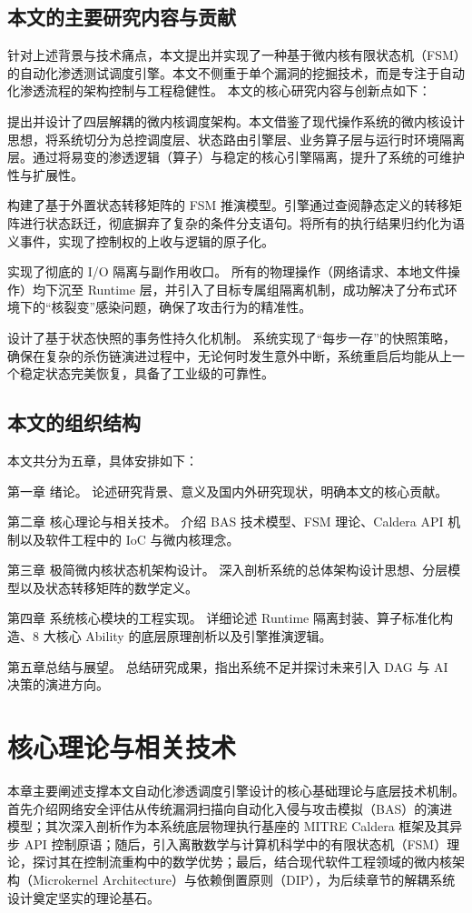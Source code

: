 \documentclass[twoside,openright]{xduugthesis}
\begin{document}
\section{本文的主要研究内容与贡献}
针对上述背景与技术痛点，本文提出并实现了一种基于微内核有限状态机（FSM）的自动化渗透测试调度引擎。本文不侧重于单个漏洞的挖掘技术，而是专注于自动化渗透流程的架构控制与工程稳健性。
本文的核心研究内容与创新点如下：

提出并设计了四层解耦的微内核调度架构。本文借鉴了现代操作系统的微内核设计思想，将系统切分为总控调度层、状态路由引擎层、业务算子层与运行时环境隔离层。通过将易变的渗透逻辑（算子）与稳定的核心引擎隔离，提升了系统的可维护性与扩展性。

构建了基于外置状态转移矩阵的 FSM 推演模型。引擎通过查阅静态定义的转移矩阵进行状态跃迁，彻底摒弃了复杂的条件分支语句。将所有的执行结果归约化为语义事件，实现了控制权的上收与逻辑的原子化。

实现了彻底的 I/O 隔离与副作用收口。 所有的物理操作（网络请求、本地文件操作）均下沉至 Runtime 层，并引入了目标专属组隔离机制，成功解决了分布式环境下的“核裂变”感染问题，确保了攻击行为的精准性。

设计了基于状态快照的事务性持久化机制。 系统实现了“每步一存”的快照策略，确保在复杂的杀伤链演进过程中，无论何时发生意外中断，系统重启后均能从上一个稳定状态完美恢复，具备了工业级的可靠性。

\section{本文的组织结构}
本文共分为五章，具体安排如下：

第一章 绪论。 论述研究背景、意义及国内外研究现状，明确本文的核心贡献。

第二章 核心理论与相关技术。 介绍 BAS 技术模型、FSM 理论、Caldera API 机制以及软件工程中的 IoC 与微内核理念。

第三章 极简微内核状态机架构设计。 深入剖析系统的总体架构设计思想、分层模型以及状态转移矩阵的数学定义。

第四章 系统核心模块的工程实现。 详细论述 Runtime 隔离封装、算子标准化构造、8 大核心 Ability 的底层原理剖析以及引擎推演逻辑。

第五章总结与展望。 总结研究成果，指出系统不足并探讨未来引入 DAG 与 AI 决策的演进方向。

\chapter{核心理论与相关技术}
本章主要阐述支撑本文自动化渗透调度引擎设计的核心基础理论与底层技术机制。首先介绍网络安全评估从传统漏洞扫描向自动化入侵与攻击模拟（BAS）的演进模型；其次深入剖析作为本系统底层物理执行基座的 MITRE Caldera 框架及其异步 API 控制原语；随后，引入离散数学与计算机科学中的有限状态机（FSM）理论，探讨其在控制流重构中的数学优势；最后，结合现代软件工程领域的微内核架构（Microkernel Architecture）与依赖倒置原则（DIP），为后续章节的解耦系统设计奠定坚实的理论基石。
\end{document}
